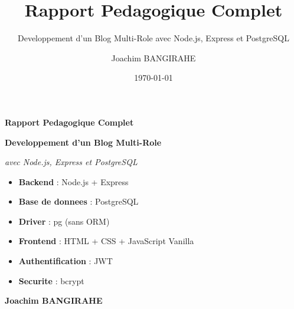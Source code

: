 \documentclass[a4paper,12pt]{book}
\title{\textbf{\Huge Rapport Pedagogique Complet}}
\subtitle{\Large Developpement d'un Blog Multi-Role avec Node.js, Express et PostgreSQL}
\author{Joachim BANGIRAHE}
\date{\today}
\begin{document}
\begin{titlepage}
    \centering
    \vspace*{2cm}
    {\Huge\bfseries\color{deepblue} Rapport Pedagogique Complet\par}
    \vspace{1cm}
    {\Large\bfseries\color{darkblue} Developpement d'un Blog Multi-Role\par}
    \vspace{0.5cm}
    {\large\itshape avec Node.js, Express et PostgreSQL\par}
    \vspace{2cm}

    \begin{tcolorbox}[colback=white,colframe=deepblue,width=0.8\textwidth,center,title=Stack Technologique]
        \begin{itemize}
            \item \textbf{Backend} : Node.js + Express
            \item \textbf{Base de donnees} : PostgreSQL
            \item \textbf{Driver} : pg (sans ORM)
            \item \textbf{Frontend} : HTML + CSS + JavaScript Vanilla
            \item \textbf{Authentification} : JWT
            \item \textbf{Securite} : bcrypt
        \end{itemize}
    \end{tcolorbox}

    \vfill
    {\small\bfseries\color{black} Joachim BANGIRAHE\par}
\end{titlepage}

\frontmatter
\tableofcontents
\cleardoublepage
\mainmatter

\end{document}
